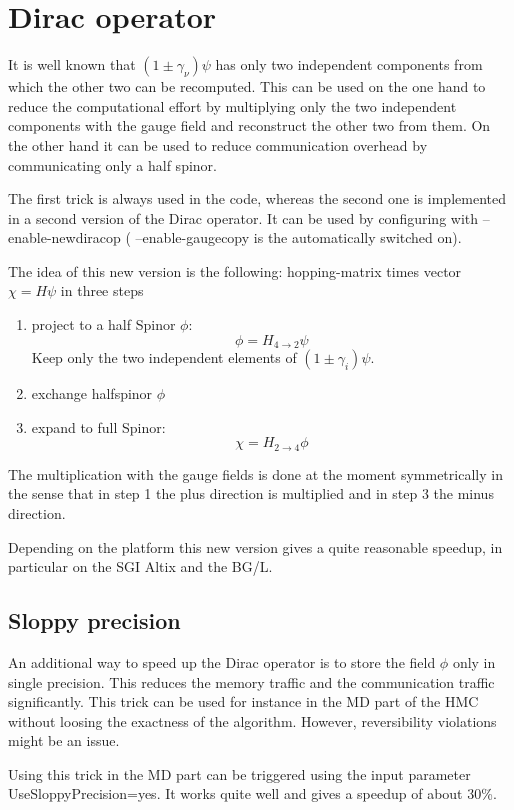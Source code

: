 \section{Dirac operator}

It is well known that $(1 \pm \gamma_\nu)\psi$ has only two
independent components from which the other two can be
recomputed. This can be used on the one hand to reduce the
computational effort by multiplying only the two independent
components with the gauge field and reconstruct the other two from
them. On the other hand it can be used to reduce communication
overhead by communicating only a half spinor. 

The first trick is always used in the code, whereas the second one is
implemented in a second version of the Dirac operator. It can be used
by configuring with {\ttfamily --enable-newdiracop} ({\ttfamily
  --enable-gaugecopy} is the automatically switched on). 

The idea of this new version is the following:
hopping-matrix times vector $\chi=H\psi$ in three steps
\begin{enumerate}
\item<1-> project to a half Spinor $\phi$:
  \[
  \phi = H_{4\to 2}\psi
  \]
  Keep only the two independent elements of $(1\pm\gamma_i)\psi$.
\item<2-> exchange halfspinor $\phi$
\item<3-> expand to full Spinor:
  \[
  \chi = H_{2\to 4}\phi
  \]
\end{enumerate}
The multiplication with the gauge fields is done at the moment
symmetrically in the sense that in step 1 the plus direction is
multiplied and in step 3 the minus direction. 

Depending on the platform this new version gives a quite reasonable
speedup, in particular on the SGI Altix and the BG/L.

\subsection{Sloppy precision}

An additional way to speed up the Dirac operator is to store the field
$\phi$ only in single precision. This reduces the memory traffic and
the communication traffic significantly. This trick can be used for
instance in the MD part of the HMC without loosing the exactness of
the algorithm. However, reversibility violations might be an issue.

Using this trick in the MD part can be triggered using the input
parameter {\ttfamily UseSloppyPrecision=yes}. It works quite well and
gives a speedup of about 30\%.

